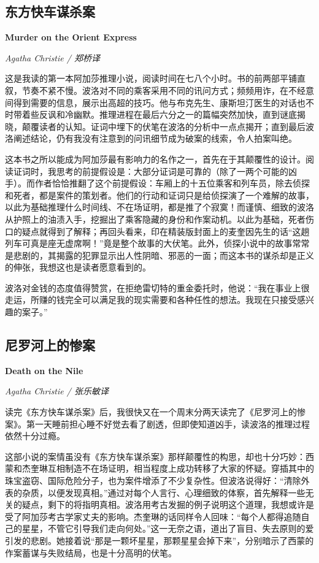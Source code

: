 \subsection*{东方快车谋杀案}
\par \textbf{Murder on the Orient Express}
\par \emph{Agatha Christie / 郑桥译} 
\par 这是我读的第一本阿加莎推理小说，阅读时间在七八个小时。书的前两部平铺直叙，节奏不紧不慢。波洛对不同的乘客采用不同的讯问方式；频频用诈，在不经意间得到需要的信息，展示出高超的技巧。他与布克先生、康斯坦汀医生的对话也不时带着些反讽和冷幽默。推理进程在最后六分之一的篇幅突然加快，直到谜底揭晓，颠覆读者的认知。证词中埋下的伏笔在波洛的分析中一点点揭开；直到最后波洛阐述结论，仍有我没有注意到的问讯细节成为破案的线索，令人拍案叫绝。
\par 这本书之所以能成为阿加莎最有影响力的名作之一，首先在于其颠覆性的设计。阅读证词时，我思考的前提假设是：大部分证词是可靠的（除了一两个可能的凶手）。而作者恰恰推翻了这个前提假设：车厢上的十五位乘客和列车员，除去侦探和死者，都是案件的策划者。他们的行动和证词只是给侦探演了一个难解的故事，以此为基础推理什么时间线、不在场证明，都是推了个寂寞！而谨慎、细致的波洛从护照上的油渍入手，挖掘出了乘客隐藏的身份和作案动机。以此为基础，死者伤口的疑点就得到了解释；再回头看来，印在精装版封面上的麦奎因先生的话“这趟列车可真是座无虚席啊！”竟是整个故事的大伏笔。此外，侦探小说中的故事常常是悲剧的，其揭露的犯罪显示出人性阴暗、邪恶的一面；而这本书的谋杀却是正义的伸张，我想这也是读者愿意看到的。
\par 波洛对金钱的态度值得赞赏，在拒绝雷切特的重金委托时，他说：“我在事业上很走运，所赚的钱完全可以满足我的现实需要和各种任性的想法。我现在只接受感兴趣的案子。”
\par {}

\subsection*{尼罗河上的惨案}
\par \textbf{Death on the Nile}
\par \emph{Agatha Christie / 张乐敏译} 
\par 读完《东方快车谋杀案》后，我很快又在一个周末分两天读完了《尼罗河上的惨案》。第一天睡前担心睡不好觉去看了剧透，但即使知道凶手，读波洛的推理过程依然十分过瘾。
\par 这部小说的案情虽没有《东方快车谋杀案》那样颠覆性的构思，却也十分巧妙：西蒙和杰奎琳互相制造不在场证明，相当程度上成功转移了大家的怀疑。穿插其中的珠宝盗窃、国际危险分子，也为案件增添了不少复杂性。但波洛说得好：“清除外表的杂质，以便发现真相。”通过对每个人言行、心理细致的体察，首先解释一些无关的疑点，剩下的将指明真相。波洛用考古发掘的例子说明这个道理，我想或许是受了阿加莎考古学家丈夫的影响。杰奎琳的话同样令人回味：“每个人都得追随自己的星星，不管它引导我们走向何处。”这一无奈之语，道出了盲目、失去原则的爱引发的悲剧。她接着说“那是一颗坏星星，那颗星星会掉下来”，分别暗示了西蒙的作案蓄谋与失败结局，也是十分高明的伏笔。
\par {}

